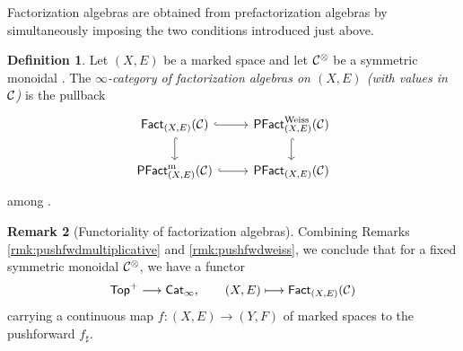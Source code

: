 \documentclass[10pt, reqno, twoside
, final
]{amsart}
\numberwithin{equation}{subsection}%
\theoremstyle{definition}
\newtheorem{defn}{Definition}[subsection]
\theoremstyle{definition}
\theoremstyle{definition}
\theoremstyle{definition}
\theoremstyle{definition}
\theoremstyle{definition}
\theoremstyle{definition}
\theoremstyle{definition}
\theoremstyle{definition}
\theoremstyle{plain}
\theoremstyle{definition}
\theoremstyle{plain}
\theoremstyle{definition}
\theoremstyle{plain}
\theoremstyle{definition}
\newtheorem{rmk}[defn]{Remark}
\theoremstyle{definition}
\theoremstyle{plain}
\theoremstyle{plain}
\theoremstyle{definition}
\theoremstyle{plain}
\theoremstyle{plain}
\theoremstyle{plain}
\begin{document}
Factorization algebras are obtained from prefactorization algebras by simultaneously imposing the two conditions introduced just above.
\begin{defn}\label{defn:pointless-fact-algs} 
Let $(X,E)$ be a marked space and let $\mathcal{C}^{\otimes}$ be a symmetric monoidal \infcatt. The \emph{$\infty$-category of factorization algebras on $(X,E)$ (with values in $\mathcal{C}$)} is the pullback
\[  
\begin{tikzcd}
    \Fact_{(X,E)}(\icat) \ar[d,hook] \ar[r,hook] &\pfact^{\mathrm{Weiss}}_{(X,E)}(\icat)  \ar[d,hook] \\
   \pfact^{\mathrm{m}}_{(X,E)}(\icat) \ar[r,hook] & \pfact_{(X,E)}(\icat) 
\end{tikzcd}
\]
among \infcatst.
\end{defn}
 \begin{rmk}[Functoriality of factorization algebras]
Combining Remarks \ref{rmk:pushfwdmultiplicative} and \ref{rmk:pushfwdweiss}, we conclude that for a fixed symmetric monoidal \infcat $\mathcal{C}^{\otimes}$, we have a functor 
\[  \mathsf{Top}^+\longrightarrow \mathsf{Cat}_{\infty},\quad\quad (X,E)\longmapsto \mathsf{Fact}_{(X,E)}(\mathcal{C}) \]
carrying a continuous map $f:(X,E)\rightarrow (Y,F)$ of marked spaces to the pushforward $f_{\sharp}$.
\end{rmk}
\end{document}
